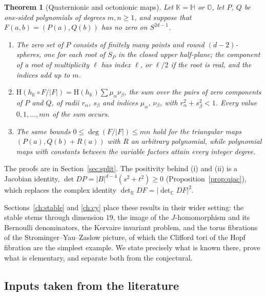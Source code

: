 \documentclass[11pt]{amsart}
\numberwithin{equation}{section}
\theoremstyle{plain}
\newtheorem{maintheorem}{Theorem}
\theoremstyle{definition}
\theoremstyle{remark}
\newcommand{\R}{\mathbb{R}}
\newcommand{\C}{\mathbb{C}}
\newcommand{\Hq}{\mathbb{H}}
\newcommand{\Oc}{\mathbb{O}}
\newcommand{\K}{\mathbb{K}}
\newcommand{\Hopf}{\mathrm{H}}
\begin{document}
\begin{maintheorem}[Quaternionic and octonionic maps]\label{thm:G}
Let $\K=\Hq$ or $\Oc$, let $P$, $Q$ be one-sided polynomials of degrees $m,n\ge1$, and suppose that $F(a,b)=(P(a),Q(b))$ has no zero on $S^{2d-1}$.
\begin{enumerate}[label=\textup{(\roman*)}]
\item The zero set of $P$ consists of finitely many points and round $(d-2)$-spheres, one for each root of $S_P$ in the closed upper half-plane; the component of a root of multiplicity $\ell$ has index $\ell$, or $\ell/2$ if the root is real, and the indices add up to $m$.
\item $\Hopf(h_\K\circ F/|F|)=\Hopf(h_\K)\sum\mu_\alpha\nu_\beta$, the sum over the pairs of zero components of $P$ and $Q$, of radii $r_\alpha$, $s_\beta$ and indices $\mu_\alpha$, $\nu_\beta$, with $r_\alpha^2+s_\beta^2<1$. Every value $0,1,\dots,mn$ of the sum occurs.
\item The same bounds $0\le\deg(F/|F|)\le mn$ hold for the triangular maps $(P(a),Q(b)+R(a))$ with $R$ an arbitrary polynomial, while polynomial maps with constants between the variable factors attain every integer degree.
\end{enumerate}
\end{maintheorem}

The proofs are in Section~\ref{sec:split}. The positivity behind (i) and (ii) is a Jacobian identity, $\det DP=|B|^{d-4}(s^2+t^2)\ge0$ (Proposition~\ref{prop:qjac}), which replaces the complex identity $\det_\R DF=|\det_\C DF|^2$.


Sections~\ref{ch:stable} and \ref{ch:cy} place these results in their wider setting: the stable stems through dimension $19$, the image of the $J$-homomorphism and its Bernoulli denominators, the Kervaire invariant problem, and the torus fibrations of the Strominger--Yau--Zaslow picture, of which the Clifford tori of the Hopf fibration are the simplest example. We state precisely what is known there, prove what is elementary, and separate both from the conjectural.

\subsection{Inputs taken from the literature}\label{sec:inputs}
\end{document}

